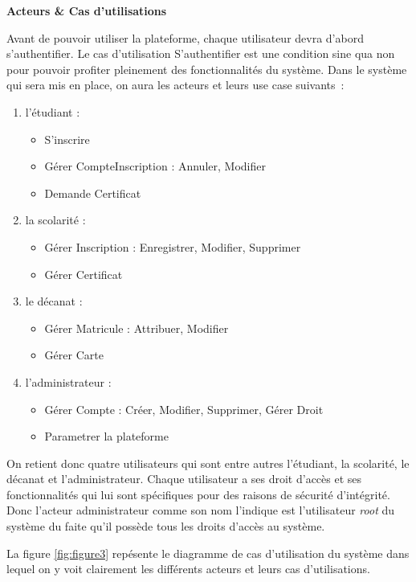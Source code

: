 \documentclass[12pt,a4paper]{article}
\begin{document}
	\textbf{Acteurs \& Cas d'utilisations}
	
	Avant de pouvoir utiliser la plateforme, chaque utilisateur devra d'abord s'authentifier.	Le cas d’utilisation S'authentifier est une condition sine qua non pour pouvoir profiter pleinement des fonctionnalités du système.
	Dans le système qui sera mis en place, on aura les acteurs et leurs use case suivants :
	\begin{enumerate}
		\item l'étudiant :
		\begin{itemize}
			\item S'inscrire
			\item Gérer CompteInscription : Annuler, Modifier
			\item Demande Certificat 
		\end{itemize}
		\item la scolarité :
		\begin{itemize}
			\item Gérer Inscription : Enregistrer, Modifier, Supprimer 
			\item Gérer Certificat 
		\end{itemize}
		\item le décanat :
		\begin{itemize}
			\item Gérer Matricule : Attribuer, Modifier
			\item Gérer Carte 
		\end{itemize}
		\item l'administrateur :
		\begin{itemize}
			\item Gérer Compte : Créer, Modifier, Supprimer, Gérer Droit
			\item Parametrer la plateforme
		\end{itemize}
	\end{enumerate}
	
	On retient donc quatre utilisateurs qui sont entre autres l’étudiant, la scolarité, le décanat et l’administrateur. Chaque utilisateur a ses droit d’accès et ses fonctionnalités qui lui sont spécifiques pour des raisons de sécurité d’intégrité. Donc l'acteur administrateur comme son nom l’indique est l'utilisateur \textit{root} du système du faite qu'il possède tous les droits d'accès au système.
	
	La figure \ref{fig:figure3} repésente le diagramme de cas d'utilisation du système dans lequel on y voit clairement les différents acteurs et leurs cas d'utilisations.
	
\end{document}
